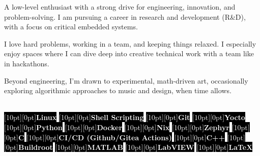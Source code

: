 \documentclass[9pt]{./src/packages/Developer_CV/developercv}
\begin{document}
\noindent %
\begin{minipage}[t]{0.60\textwidth} %
    \raggedright

    A low-level enthusiast with a strong drive for engineering,
    innovation, and problem-solving. I am pursuing a career in research and
    development (R\&D), with a focus on critical embedded systems.

    I love hard problems, working in a team, and keeping things relaxed.
    I especially enjoy spaces where I can dive deep into creative technical work
    with a team like in hackathons.

    Beyond engineering, I’m drawn to experimental, math-driven art, occasionally
    exploring algorithmic approaches to music and design, when time allows.

\end{minipage}
\hfill %
\begin{minipage}[t]{0.35\textwidth}
    \raggedright %
    \\
    \colorbox{black}{\textcolor{white}{\raisebox{0.5ex}[10pt][0pt]{\textbf{Linux}}}}
    \colorbox{black}{\textcolor{white}{\raisebox{0.5ex}[10pt][0pt]{\textbf{Shell Scripting}}}}
    \colorbox{black}{\textcolor{white}{\raisebox{0.5ex}[10pt][0pt]{\textbf{Git}}}}
    \colorbox{black}{\textcolor{white}{\raisebox{0.5ex}[10pt][0pt]{\textbf{Yocto}}}}
    \colorbox{black}{\textcolor{white}{\raisebox{0.5ex}[10pt][0pt]{\textbf{Python}}}}
    \colorbox{black}{\textcolor{white}{\raisebox{0.5ex}[10pt][0pt]{\textbf{Docker}}}}
    \colorbox{black}{\textcolor{white}{\raisebox{0.5ex}[10pt][0pt]{\textbf{Nix}}}}
    \colorbox{black}{\textcolor{white}{\raisebox{0.5ex}[10pt][0pt]{\textbf{Zephyr}}}}
    \colorbox{black}{\textcolor{white}{\raisebox{0.5ex}[10pt][0pt]{\textbf{C}}}}
    \colorbox{black}{\textcolor{white}{\raisebox{0.5ex}[10pt][0pt]{\textbf{CI/CD (Github/Gitea Actions)}}}}
    \colorbox{black}{\textcolor{white}{\raisebox{0.5ex}[10pt][0pt]{\textbf{C++}}}}
    \colorbox{black}{\textcolor{white}{\raisebox{0.5ex}[10pt][0pt]{\textbf{Buildroot}}}}
    \colorbox{black}{\textcolor{white}{\raisebox{0.5ex}[10pt][0pt]{\textbf{MATLAB}}}}
    \colorbox{black}{\textcolor{white}{\raisebox{0.5ex}[10pt][0pt]{\textbf{LabVIEW}}}}
    \colorbox{black}{\textcolor{white}{\raisebox{0.5ex}[10pt][0pt]{\textbf{LaTeX}}}}
    \\
\end{minipage}
\end{document}
